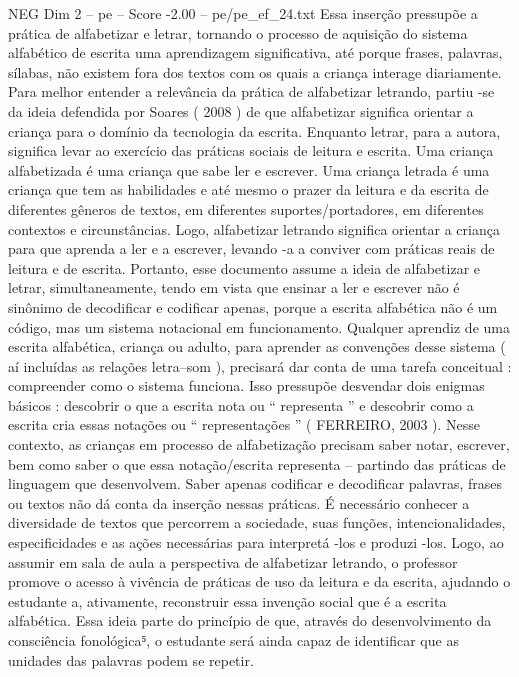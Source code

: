 \begin{textsample}{NEG Dim 2 – pe – Score -2.00 – pe/pe\_ef\_24.txt}
Essa inserção pressupõe a prática de alfabetizar e letrar, tornando o processo de aquisição do sistema alfabético de escrita uma aprendizagem significativa, até porque frases, palavras, sílabas, não existem fora dos textos com os quais a criança interage diariamente.
Para melhor entender a relevância da prática de alfabetizar letrando, partiu -se da ideia defendida por Soares ( 2008 ) de que alfabetizar significa orientar a criança para o domínio da tecnologia da escrita.
Enquanto letrar, para a autora, significa levar ao exercício das práticas sociais de leitura e escrita.
Uma criança alfabetizada é uma criança que sabe ler e escrever.
Uma criança letrada é uma criança que tem as habilidades e até mesmo o prazer da leitura e da escrita de diferentes gêneros de textos, em diferentes suportes/portadores, em diferentes contextos e circunstâncias.
Logo, alfabetizar letrando significa orientar a criança para que aprenda a ler e a escrever, levando -a a conviver com práticas reais de leitura e de escrita.
Portanto, esse documento assume a ideia de alfabetizar e letrar, simultaneamente, tendo em vista que ensinar a ler e escrever não é sinônimo de decodificar e codificar apenas, porque a escrita alfabética não é um código, mas um sistema notacional em funcionamento.
Qualquer aprendiz de uma escrita alfabética, criança ou adulto, para aprender as convenções desse sistema ( aí incluídas as relações letra–som ), precisará dar conta de uma tarefa conceitual : compreender como o sistema funciona.
Isso pressupõe desvendar dois enigmas básicos : descobrir o que a escrita nota ou “ representa ” e descobrir como a escrita cria essas notações ou “ representações ” ( FERREIRO, 2003 ).
Nesse contexto, as crianças em processo de alfabetização precisam saber notar, escrever, bem como saber o que essa notação/escrita representa – partindo das práticas de linguagem que desenvolvem.
Saber apenas codificar e decodificar palavras, frases ou textos não dá conta da inserção nessas práticas.
É necessário conhecer a diversidade de textos que percorrem a sociedade, suas funções, intencionalidades, especificidades e as ações necessárias para interpretá -los e produzi -los.
Logo, ao assumir em sala de aula a perspectiva de alfabetizar letrando, o professor promove o acesso à vivência de práticas de uso da leitura e da escrita, ajudando o estudante a, ativamente, reconstruir essa invenção social que é a escrita alfabética.
Essa ideia parte do princípio de que, através do desenvolvimento da consciência fonológica⁵, o estudante será ainda capaz de identificar que as unidades das palavras podem se repetir.

\end{textsample}
